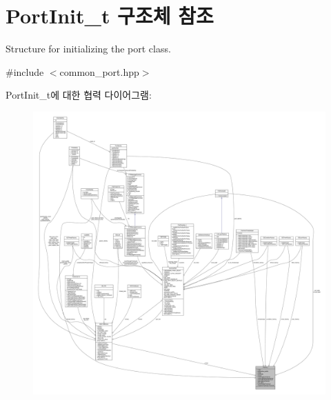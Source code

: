 \hypertarget{struct_port_init__t}{}\section{Port\+Init\+\_\+t 구조체 참조}
\label{struct_port_init__t}


Structure for initializing the port class.  




{\ttfamily \#include $<$common\+\_\+port.\+hpp$>$}



Port\+Init\+\_\+t에 대한 협력 다이어그램\+:
\nopagebreak
\begin{figure}[H]
\begin{center}
\leavevmode
\includegraphics[width=350pt]{struct_port_init__t__coll__graph}
\end{center}
\end{figure}
